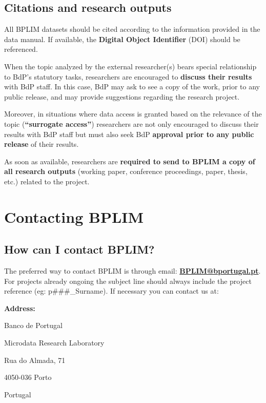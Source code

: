 \documentclass[
  a4paper,
  DIV=11,
  numbers=noendperiod]{scrartcl}
\begin{document}
\hypertarget{citations-and-research-outputs}{%
\subsection{Citations and research
outputs}\label{citations-and-research-outputs}}

All BPLIM datasets should be cited according to the information provided
in the data manual. If available, the \textbf{Digital Object Identifier}
(DOI) should be referenced.

When the topic analyzed by the external researcher(s) bears special
relationship to BdP's statutory tasks, researchers are encouraged to
\textbf{discuss their results} with BdP staff. In this case, BdP may ask
to see a copy of the work, prior to any public release, and may provide
suggestions regarding the research project.

Moreover, in situations where data access is granted based on the
relevance of the topic (\textbf{``surrogate access''}) researchers are
not only encouraged to discuss their results with BdP staff but must
also seek BdP \textbf{approval prior to any public release} of their
results.

As soon as available, researchers are \textbf{required to send to BPLIM
a copy of all research outputs} (working paper, conference proceedings,
paper, thesis, etc.) related to the project.

\hypertarget{contacting-bplim}{%
\section{Contacting BPLIM}\label{contacting-bplim}}

\hypertarget{how-can-i-contact-bplim}{%
\subsection{How can I contact BPLIM?}\label{how-can-i-contact-bplim}}

The preferred way to contact BPLIM is through email:
\href{mailto:bplim@bportugal.pt}{\textbf{BPLIM@bportugal.pt}}. For
projects already ongoing the subject line should always include the
project reference (eg: p\#\#\#\_Surname). If necessary you can contact
us at:

\textbf{Address:}

Banco de Portugal

Microdata Research Laboratory

Rua do Almada, 71

4050-036 Porto

Portugal
\end{document}
